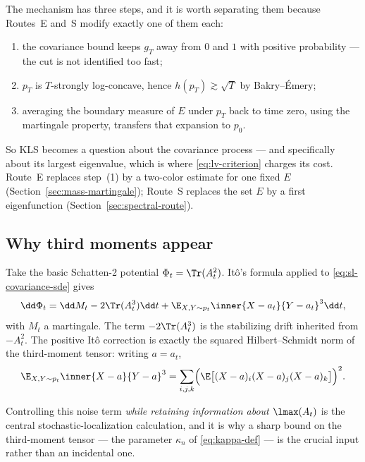 \documentclass[../../main.tex]{subfiles}
\begin{document}
The mechanism has three steps, and it is worth separating them because Routes~E and~S
modify exactly one of them each:
\begin{enumerate}[label=(\arabic*),leftmargin=2.4em]
  \item the covariance bound keeps $g_T$ away from $0$ and $1$ with positive probability --- the
  cut is not identified too fast;
  \item $p_T$ is $T$-strongly log-concave, hence $h(p_T)\gtrsim\sqrt T$ by Bakry--\'Emery;
  \item averaging the boundary measure of $E$ under $p_T$ back to time zero, using the martingale
  property, transfers that expansion to $p_0$.
\end{enumerate}

So KLS becomes a question about the covariance process --- and specifically about its largest
eigenvalue, which is where \eqref{eq:lv-criterion} charges its cost. Route~E replaces step~(1) by
a two-color estimate for one fixed $E$ (Section~\ref{sec:mass-martingale}); Route~S replaces the
set $E$ by a first eigenfunction (Section~\ref{sec:spectral-route}).

\subsection{Why third moments appear}
\label{subsec:sl-third-moments}

Take the basic Schatten-2 potential $\Phi_t=\Tr(A_t^2)$. It\^o's formula applied to
\eqref{eq:sl-covariance-sde} gives
\begin{equation}
  \dd\Phi_t
  =\dd M_t
  -2\Tr(A_t^3)\dd t
  +\E_{X,Y\sim p_t}\inner{X-a_t}{Y-a_t}^3\dd t ,
  \label{eq:trace-potential-ito}
\end{equation}
with $M_t$ a martingale. The term $-2\Tr(A_t^3)$ is the stabilizing drift inherited from $-A_t^2$.
The positive It\^o correction is exactly the squared Hilbert--Schmidt norm of the third-moment
tensor: writing $a=a_t$,
\begin{equation}
  \E_{X,Y\sim p_t}\inner{X-a}{Y-a}^3
  =\sum_{i,j,k}\Bigl(\E\bigl[(X-a)_i(X-a)_j(X-a)_k\bigr]\Bigr)^2 .
  \label{eq:third-moment-identity}
\end{equation}

Controlling this noise term \emph{while retaining information about $\lmax(A_t)$} is the central
stochastic-localization calculation, and it is why a sharp bound on the third-moment tensor ---
the parameter $\kappa_n$ of \eqref{eq:kappa-def} --- is the crucial input rather than an
incidental one.
\end{document}

